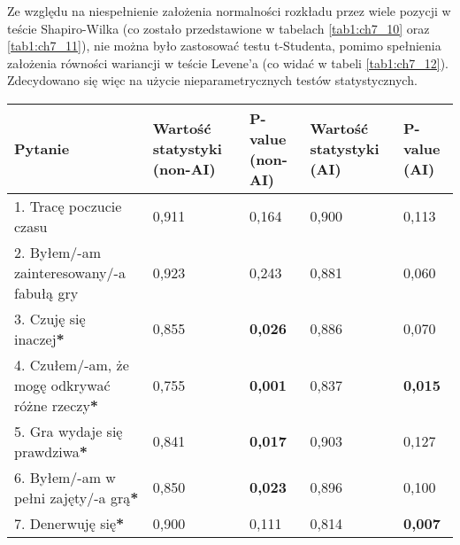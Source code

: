 Ze względu na niespełnienie założenia normalności rozkładu przez wiele pozycji w teście Shapiro-Wilka (co zostało
przedstawione w tabelach \ref{tab1:ch7_10} oraz \ref{tab1:ch7_11}), nie można było zastosować testu t-Studenta,
pomimo spełnienia założenia równości wariancji w teście Levene'a (co widać w tabeli \ref{tab1:ch7_12}). Zdecydowano
się więc na użycie nieparametrycznych testów statystycznych.

\newpage

\begin{table}[!h]
    \begin{center}
        \begin{tabular}{|m{10em}|m{5em}|m{5em}|m{5em}|m{5em}|}
            \hline
            Pytanie                                                                     & Wartość statystyki (non-AI) & P-value (non-AI) & Wartość statystyki (AI) & P-value (AI)   \\
            \hline
            1. Tracę poczucie czasu                                                     & 0,911                       & 0,164            & 0,900                   & 0,113          \\
            2. Byłem/-am \newline zainteresowany/-a fabułą gry                          & 0,923                       & 0,243            & 0,881                   & 0,060          \\
            3. Czuję się inaczej\textbf{*}                                              & 0,855                       & \textbf{0,026}   & 0,886                   & 0,070          \\
            4. Czułem/-am, że mogę odkrywać różne rzeczy\textbf{*}                      & 0,755                       & \textbf{0,001}   & 0,837                   & \textbf{0,015} \\
            5. Gra wydaje się prawdziwa\textbf{*}                                       & 0,841                       & \textbf{0,017}   & 0,903                   & 0,127          \\
            6. Byłem/-am \newline w pełni zajęty/-a grą\textbf{*}                       & 0,850                       & \textbf{0,023}   & 0,896                   & 0,100          \\
            7. Denerwuję się\textbf{*}                                                  & 0,900                       & 0,111            & 0,814                   & \textbf{0,007} \\

\end{tabular}
\end{center}
\end{table}
